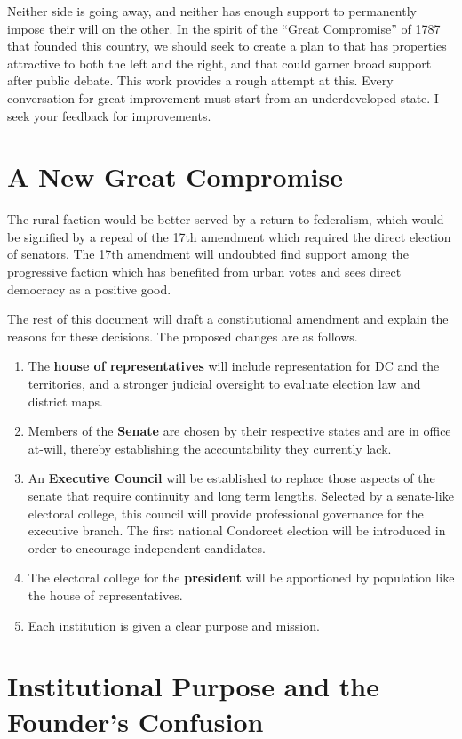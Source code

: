 \documentclass{article}
\begin{document}
Neither side is going away, and neither has enough support to permanently impose their will on the other. In the spirit of the “Great Compromise” of 1787 that founded this country, we should seek to create a plan to that has properties attractive to both the left and the right, and that could garner broad support after public debate. This work provides a rough attempt at this. Every conversation for great improvement must start from an underdeveloped state. I seek your feedback for improvements.

\section{A New Great Compromise}

The rural faction would be better served by a return to federalism, which would be signified by a repeal of the 17th amendment\cite{Tucker}\cite{Virginia} which required the direct election of senators. The 17th amendment will undoubted find support among the progressive faction which has benefited from urban votes and sees direct democracy as a positive good\cite{Smith}.

The rest of this document will draft a constitutional amendment and explain the reasons for these decisions. The proposed changes are as follows.
\begin{enumerate}
  \item The \textbf{house of representatives} will include representation for DC and the territories, and a stronger judicial oversight to evaluate election law and district maps.
  \item Members of the \textbf{Senate} are chosen by their respective states and are in office at-will, thereby establishing the accountability they currently lack.
  \item An \textbf{Executive Council} will be established to replace those aspects of the senate that require continuity and long term lengths. Selected by a senate-like electoral college, this council will provide professional governance for the executive branch. The first national Condorcet election will be introduced in order to encourage independent candidates.
  \item The electoral college for the \textbf{president} will be apportioned by population like the house of representatives.
 \item Each institution is given a clear purpose and mission.
\end{enumerate}

\section{Institutional Purpose and the Founder’s Confusion}
\end{document}
